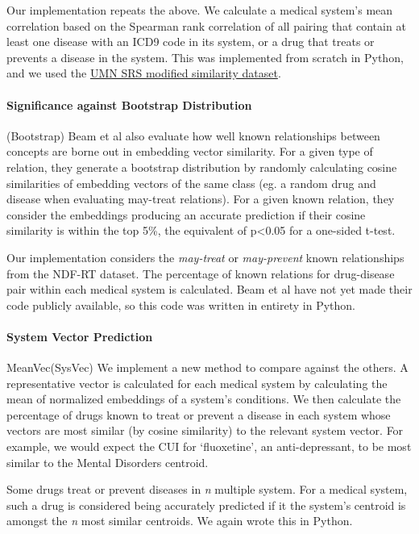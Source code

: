 \documentclass[10pt]{article}
\begin{document}
Our implementation repeats the above. We calculate a medical system's mean correlation based on the Spearman rank correlation of all pairing that contain at least one disease with an ICD9 code in its system, or a drug that treats or prevents a disease in the system. This was implemented from scratch in Python, and we used the \href{https://conservancy.umn.edu/handle/11299/196265}{UMN SRS modified similarity dataset}.

\paragraph{Significance against Bootstrap Distribution}(Bootstrap)
Beam et al  also evaluate how well known relationships between concepts are borne out in embedding vector similarity. For a given type of relation, they generate a bootstrap distribution by randomly calculating cosine similarities of embedding vectors of the same class (eg. a random drug and disease when evaluating  may-treat relations). For a given known relation, they consider the embeddings producing an accurate prediction if their cosine similarity is within the top 5\%, the equivalent of p<0.05 for a one-sided t-test. 

Our implementation considers the \emph{may-treat} or \emph{may-prevent} known relationships from the NDF-RT dataset. The percentage of known relations for drug-disease pair within each medical system is calculated. Beam et al have not yet made their code publicly available, so this code was written in entirety in Python. 

\paragraph{System Vector Prediction}{MeanVec}(SysVec)
We implement a new method to compare against the others. A representative vector is calculated for each medical system by calculating the mean of normalized embeddings of a system's conditions. We then calculate the percentage of drugs known to treat or prevent a disease in each system whose vectors are most similar (by cosine similarity) to the relevant system vector. For example, we would expect the CUI for `fluoxetine', an anti-depressant, to be most similar to the Mental Disorders centroid. 

Some drugs treat or prevent diseases in \emph{n} multiple system. For a medical system, such a drug is considered being accurately predicted if it the system's centroid is amongst the \emph{n} most similar centroids. We again wrote this in Python. 
\end{document}
